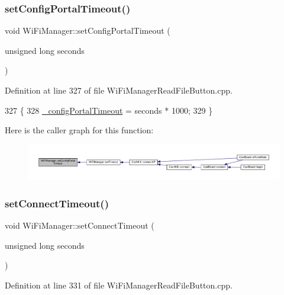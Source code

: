 \subsubsection{\texorpdfstring{set\+Config\+Portal\+Timeout()}{setConfigPortalTimeout()}}
{\footnotesize\ttfamily void Wi\+Fi\+Manager\+::set\+Config\+Portal\+Timeout (\begin{DoxyParamCaption}\item[{unsigned long}]{seconds }\end{DoxyParamCaption})}



Definition at line 327 of file Wi\+Fi\+Manager\+Read\+File\+Button.\+cpp.


\begin{DoxyCode}
327                                                               \{
328   \hyperlink{class_wi_fi_manager_ae6c969ba67e0a029dcde1c3511ca79b7}{\_configPortalTimeout} = seconds * 1000;
329 \}
\end{DoxyCode}
Here is the caller graph for this function\+:
\nopagebreak
\begin{figure}[H]
\begin{center}
\leavevmode
\includegraphics[width=350pt]{d4/dc8/class_wi_fi_manager_a904006cb4d2c769e93bfdef336853766_icgraph}
\end{center}
\end{figure}
\mbox{\label{class_wi_fi_manager_a508fa98e77d165b29764f68d48b7a349}} 
\subsubsection{\texorpdfstring{set\+Connect\+Timeout()}{setConnectTimeout()}}
{\footnotesize\ttfamily void Wi\+Fi\+Manager\+::set\+Connect\+Timeout (\begin{DoxyParamCaption}\item[{unsigned long}]{seconds }\end{DoxyParamCaption})}



Definition at line 331 of file Wi\+Fi\+Manager\+Read\+File\+Button.\+cpp.


